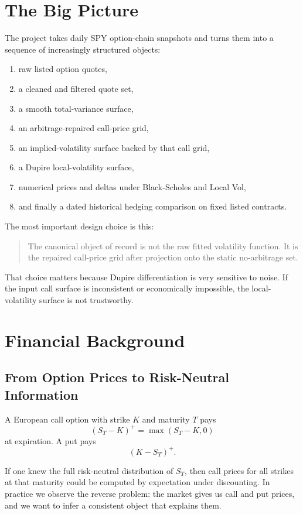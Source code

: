 \documentclass[11pt]{article}
\begin{document}
\section{The Big Picture}

The project takes daily SPY option-chain snapshots and turns them into a sequence of increasingly structured objects:

\begin{enumerate}
  \item raw listed option quotes,
  \item a cleaned and filtered quote set,
  \item a smooth total-variance surface,
  \item an arbitrage-repaired call-price grid,
  \item an implied-volatility surface backed by that call grid,
  \item a Dupire local-volatility surface,
  \item numerical prices and deltas under Black-Scholes and Local Vol,
  \item and finally a dated historical hedging comparison on fixed listed contracts.
\end{enumerate}

The most important design choice is this:

\begin{quote}
The canonical object of record is not the raw fitted volatility function. It is the repaired call-price grid after projection onto the static no-arbitrage set.
\end{quote}

That choice matters because Dupire differentiation is very sensitive to noise. If the input call surface is inconsistent or economically impossible, the local-volatility surface is not trustworthy.

\section{Financial Background}

\subsection{From Option Prices to Risk-Neutral Information}

A European call option with strike $K$ and maturity $T$ pays
\[
(S_T - K)^+ = \max(S_T - K, 0)
\]
at expiration. A put pays
\[
(K - S_T)^+.
\]

If one knew the full risk-neutral distribution of $S_T$, then call prices for all strikes at that maturity could be computed by expectation under discounting. In practice we observe the reverse problem: the market gives us call and put prices, and we want to infer a consistent object that explains them.
\end{document}
